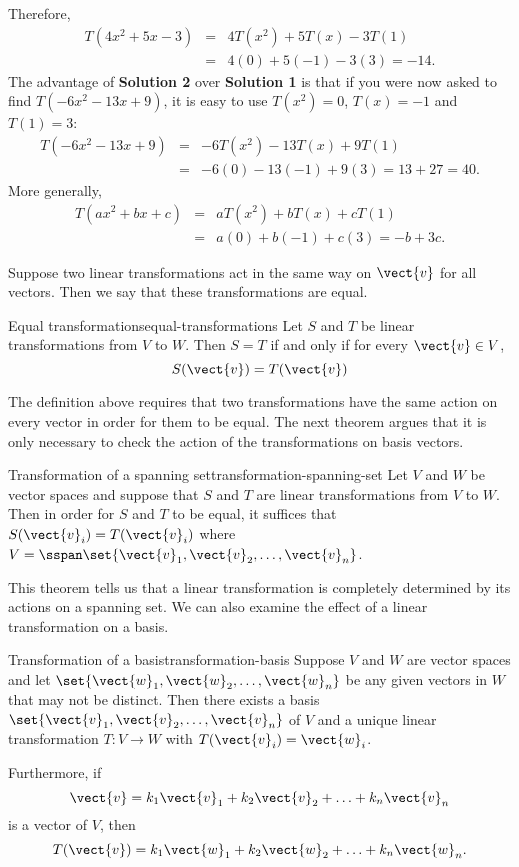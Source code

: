 \begin{solution}
Therefore,
\begin{eqnarray*}
T(4x^2+5x-3) & = & 4T(x^2) + 5T(x) -3T(1) \\
& = & 4(0) + 5(-1) - 3(3)=-14.
\end{eqnarray*}
The advantage of \textbf{Solution 2} over \textbf{Solution 1} is that 
if you were now asked to find $T(-6x^2-13x+9)$, it is easy to
use $T(x^2)=0$, $T(x)=-1$ and $T(1)= 3$:
\begin{eqnarray*}
T(-6x^2-13x+9) & = & -6T(x^2)-13T(x)+9T(1) \\
& = & -6(0)-13(-1)+9(3)=13+27=40.
\end{eqnarray*}
More generally, 
\begin{eqnarray*}
T(ax^2+bx+c) & = & aT(x^2)+bT(x)+cT(1) \\
& = & a(0)+b(-1)+c(3)=-b+3c.
\end{eqnarray*}
\end{solution}

Suppose two linear transformations act in the same way on $\vect{v}$ for all vectors. Then we say that these transformations are equal.

\begin{definition}{Equal transformations}{equal-transformations}
Let $S$ and $T$ be linear transformations from $V$ to $W$. Then $S = T$ if and only if for every $\vect{v} \in V$, 
\[
S (\vect{v}) = T (\vect{v})
\]
\end{definition}

The definition above requires that two transformations have the same action on every vector in order for them to be equal. The next theorem argues that it is only necessary to check the action of the transformations on basis vectors.

\begin{theorem}{Transformation of a spanning set}{transformation-spanning-set}
Let $V$ and $W$ be vector spaces and suppose that $S$ and $T$ are linear transformations from $V$ to $W$. Then in order for $S$ and $T$ to be equal, it suffices that $S(\vect{v}_i) = T(\vect{v}_i)$ where $V=\sspan \set{\vect{v}_1, \vect{v}_2, \ldots, \vect{v}_n}$.
\end{theorem}

This theorem tells us that a linear transformation is completely
determined by its actions on a spanning set. We can also examine the effect of a linear transformation on a basis.

\begin{theorem}{Transformation of a basis}{transformation-basis}
Suppose $V$ and $W$ are vector spaces and let $\set{\vect{w}_1, \vect{w}_2, \ldots, \vect{w}_n}$ be any given vectors in $W$ that may not be distinct. Then there exists a basis $\set{\vect{v}_1, \vect{v}_2, \ldots, \vect{v}_n}$ of $V$ and a unique linear transformation $T: V \to W$ with $T (\vect{v}_i) = \vect{w}_i$.

Furthermore, if 
\[ \vect{v} = k_1\vect{v}_1+k_2\vect{v}_2+\ldots+ k_n\vect{v}_n\]
is a vector of $V$, then
\[ T(\vect{v}) = k_1\vect{w}_1+k_2\vect{w}_2+\ldots+ k_n\vect{w}_n.\]
\end{theorem}
